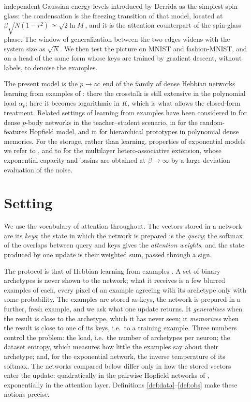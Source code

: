 \documentclass{SciPost}
\theoremstyle{plain}
\theoremstyle{definition}
\begin{document}
independent Gaussian energy levels introduced by Derrida \cite{Derrida1980,Derrida1981} as the simplest spin glass: the condensation is the freezing transition of that model, located at $\beta\sqrt{N(1-r^2)}\simeq\sqrt{2\ln M}$, and it is the attention counterpart of the spin-glass phase. The window of generalization between the two edges widens with the system size as $\sqrt N$. We then test the picture on MNIST and fashion-MNIST, and on a head of the same form whose keys are trained by gradient descent, without labels, to denoise the examples.

The present model is the $p\to\infty$ end of the family of dense Hebbian networks learning from examples of \cite{Agliari2023sup,Agliari2023unsup}: there the crosstalk is still extensive in the polynomial load $\alpha_p$; here it becomes logarithmic in $K$, which is what allows the closed-form treatment. Related settings of learning from examples have been considered in \cite{Theriault2024} for dense $p$-body networks in the teacher--student scenario, in \cite{Negri2023} for the random-features Hopfield model, and in \cite{Cowsik2026} for hierarchical prototypes in polynomial dense memories. For the storage, rather than learning, properties of exponential models we refer to \cite{Demircigil2017,Lucibello2024,Albanese2025exp}, and to \cite{Agliari2026hetero} for the multilayer hetero-associative extension, whose exponential capacity and basins are obtained at $\beta\to\infty$ by a large-deviation evaluation of the noise.

\section{Setting}\label{sec:setting}

We use the vocabulary of attention throughout. The vectors stored in a network are its \emph{keys}; the state in which the network is prepared is the \emph{query}; the softmax of the overlaps between query and keys gives the \emph{attention weights}, and the state produced by one update is their weighted sum, passed through a sign.

The protocol is that of Hebbian learning from examples \cite{Agliari2022concept,Alemanno2023}. A set of binary archetypes is never shown to the network; what it receives is a few blurred examples of each, every pixel of an example agreeing with its archetype only with some probability. The examples are stored as keys, the network is prepared in a further, fresh example, and we ask what one update returns. It \emph{generalizes} when the result is close to the archetype, which it has never seen; it \emph{memorizes} when the result is close to one of its keys, i.e.\ to a training example. Three numbers control the problem: the load, i.e.\ the number of archetypes per neuron; the dataset entropy, which measures how little the examples say about their archetype; and, for the exponential network, the inverse temperature of its softmax. The networks compared below differ only in how the stored vectors enter the update: quadratically in the pairwise Hopfield networks of \cite{Agliari2022concept,Alemanno2023}, exponentially in the attention layer. Definitions \ref{def:data}--\ref{def:obs} make these notions precise.
\end{document}
